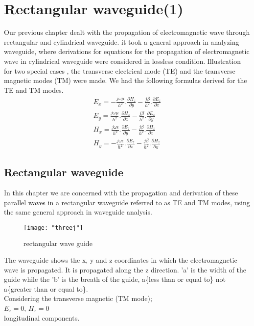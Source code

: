 \chapter{Rectangular waveguide(1)}
Our previous chapter dealt with the propagation of electromagnetic wave through rectangular and cylindrical waveguide. it took a general approach in analyzing waveguide, where derivations for equations for the propagation of electromagnetic wave in cylindrical waveguide were considered in lossless condition. Illustration for two special cases , the transverse electrical mode (TE) and the transverse magnetic modes (TM) were made. We had the following formulas derived for the TE and TM modes.
\begin{align*}
	E_x = -\frac{j\omega\mu}{h^2}.\frac{\partial H_z}{\partial y} - \frac{j\beta}{h^2}.\frac{\partial E_z}{\partial x}\\
	E_y = \frac{j\omega\mu}{h^2}.\frac{\partial H_z}{\partial x} - \frac{j\beta}{h^2}.\frac{\partial E_z}{\partial y}\\
	H_x = \frac{j\omega\epsilon}{h^2}.\frac{\partial E_z}{\partial y} - \frac{j\beta}{h^2}.\frac{\partial H_z}{\partial x}\\
	H_y = -\frac{j\omega\epsilon}{h^2}.\frac{\partial E_z}{\partial x} - \frac{j\beta}{h^2}.\frac{\partial H_z}{\partial y}
\end{align*}

\section{Rectangular waveguide}
In this chapter we are concerned with the propagation and derivation of these parallel waves in a rectangular waveguide referred to as TE and TM modes, using the same general approach in waveguide analysis.
\begin{figure}
	\centering
	\texttt{[image: "threej"]}
	\caption{rectangular wave guide}
	\label{fig:three}
\end{figure}
The waveguide shows the x, y and z coordinates in which the electromagnetic wave is propagated. It is propagated along the z direction. 'a' is the width of the guide while the 'b' is the breath of the guide, a\{less than or equal to\} not a\{greater than or equal to\}.\\
Considering the transverse magnetic (TM mode); \\
$ E_{z} = 0$, $H_{z} = 0 $\\ longitudinal components.\\
\\

